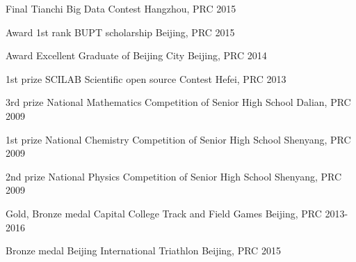 \begin{cvhonors}

\cvhonor
{Final} %
{Tianchi Big Data Contest} %
{Hangzhou, PRC} %
{2015} %






\cvhonor
{Award} %
{1st rank BUPT scholarship} %
{Beijing, PRC} %
{2015} %


\cvhonor
{Award} %
{Excellent Graduate of Beijing City} %
{Beijing, PRC} %
{2014} %



\cvhonor
{1st prize} %
{SCILAB Scientific open source Contest} %
{Hefei, PRC} %
{2013} %


\cvhonor
{3rd prize} %
{National Mathematics Competition of Senior High School} %
{Dalian, PRC} %
{2009} %

\cvhonor
{1st prize} %
{National Chemistry Competition of Senior High School} %
{Shenyang, PRC} %
{2009} %

\cvhonor
{2nd prize} %
{National Physics Competition of Senior High School} %
{Shenyang, PRC} %
{2009} %

\cvhonor
{Gold, Bronze medal} %
{Capital College Track and Field Games} %
{Beijing, PRC} %
{2013-2016} %

\cvhonor
{Bronze medal} %
{Beijing International Triathlon} %
{Beijing, PRC} %
{2015} %


\end{cvhonors}
